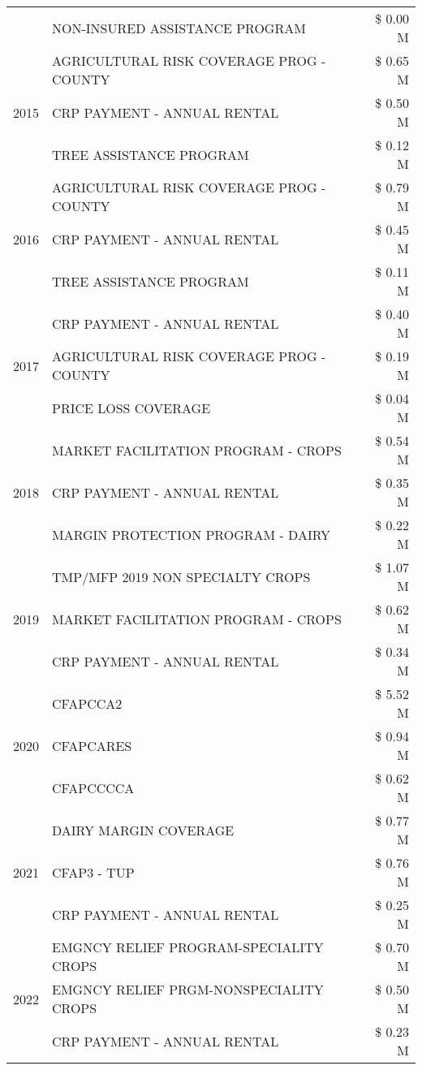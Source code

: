 \begin{tabular}{llr}
 & NON-INSURED ASSISTANCE PROGRAM & \$ 0.00 M \\
\cline{1-3}
\multirow[t]{3}{*}{2015} & AGRICULTURAL RISK COVERAGE PROG - COUNTY & \$ 0.65 M \\
 & CRP PAYMENT - ANNUAL RENTAL & \$ 0.50 M \\
 & TREE ASSISTANCE PROGRAM & \$ 0.12 M \\
\cline{1-3}
\multirow[t]{3}{*}{2016} & AGRICULTURAL RISK COVERAGE PROG - COUNTY & \$ 0.79 M \\
 & CRP PAYMENT - ANNUAL RENTAL & \$ 0.45 M \\
 & TREE ASSISTANCE PROGRAM & \$ 0.11 M \\
\cline{1-3}
\multirow[t]{3}{*}{2017} & CRP PAYMENT - ANNUAL RENTAL & \$ 0.40 M \\
 & AGRICULTURAL RISK COVERAGE PROG - COUNTY & \$ 0.19 M \\
 & PRICE LOSS COVERAGE & \$ 0.04 M \\
\cline{1-3}
\multirow[t]{3}{*}{2018} & MARKET FACILITATION PROGRAM - CROPS & \$ 0.54 M \\
 & CRP PAYMENT - ANNUAL RENTAL & \$ 0.35 M \\
 & MARGIN PROTECTION PROGRAM - DAIRY & \$ 0.22 M \\
\cline{1-3}
\multirow[t]{3}{*}{2019} & TMP/MFP 2019 NON SPECIALTY CROPS & \$ 1.07 M \\
 & MARKET FACILITATION PROGRAM - CROPS & \$ 0.62 M \\
 & CRP PAYMENT - ANNUAL RENTAL & \$ 0.34 M \\
\cline{1-3}
\multirow[t]{3}{*}{2020} & CFAPCCA2 & \$ 5.52 M \\
 & CFAPCARES & \$ 0.94 M \\
 & CFAPCCCCA & \$ 0.62 M \\
\cline{1-3}
\multirow[t]{3}{*}{2021} & DAIRY MARGIN COVERAGE & \$ 0.77 M \\
 & CFAP3 - TUP & \$ 0.76 M \\
 & CRP PAYMENT - ANNUAL RENTAL & \$ 0.25 M \\
\cline{1-3}
\multirow[t]{3}{*}{2022} & EMGNCY RELIEF PROGRAM-SPECIALITY CROPS & \$ 0.70 M \\
 & EMGNCY RELIEF PRGM-NONSPECIALITY CROPS & \$ 0.50 M \\
 & CRP PAYMENT - ANNUAL RENTAL & \$ 0.23 M \\
\cline{1-3}
\bottomrule
\end{tabular}
